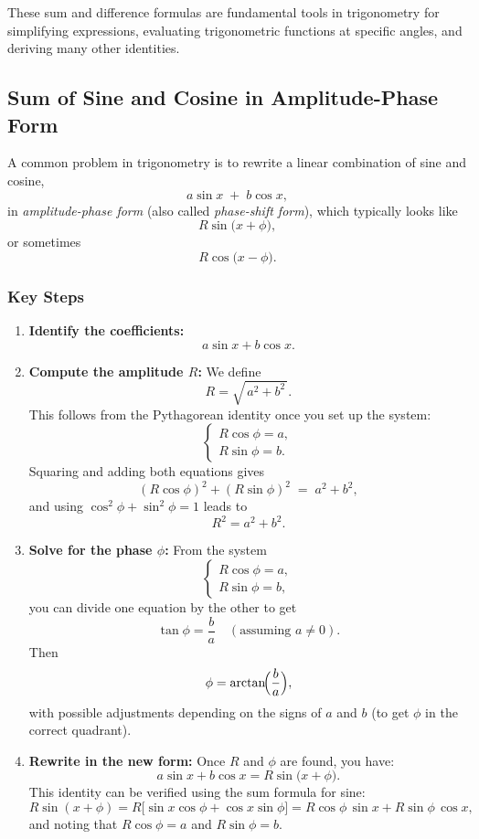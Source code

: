 \documentclass{article}
\begin{document}
\begin{multicols}{2}
These sum and difference formulas are fundamental tools in trigonometry for simplifying expressions, evaluating trigonometric functions at specific angles, and deriving many other identities.

\subsection*{Sum of Sine and Cosine in Amplitude-Phase Form}

A common problem in trigonometry is to rewrite a linear combination of sine and cosine,
\[
a \sin x \;+\; b \cos x,
\]
in \emph{amplitude-phase form} (also called \emph{phase-shift form}), which typically looks like
\[
R \sin\!\bigl(x + \phi\bigr),
\]
or sometimes
\[
R \cos\!\bigl(x - \phi\bigr).
\]

\subsubsection*{Key Steps}

\begin{enumerate}
\item \textbf{Identify the coefficients:}
  \[
  a \sin x + b \cos x.
  \]
\item \textbf{Compute the amplitude \(R\):}  
  We define
  \[
    R = \sqrt{\,a^2 + b^2\,}.
  \]
  This follows from the Pythagorean identity once you set up the system:
  \[
    \begin{cases}
      R \cos \phi = a,\\[6pt]
      R \sin \phi = b.
    \end{cases}
  \]
  Squaring and adding both equations gives
  \[
    (R \cos \phi)^2 + (R \sin \phi)^2 \;=\; a^2 + b^2,
  \]
  and using \(\cos^2 \phi + \sin^2 \phi = 1\) leads to
  \[
    R^2 = a^2 + b^2.
  \]
\item \textbf{Solve for the phase \(\phi\):}
  From the system
  \[
    \begin{cases}
      R \cos \phi = a,\\[6pt]
      R \sin \phi = b,
    \end{cases}
  \]
  you can divide one equation by the other to get
  \[
    \tan \phi = \dfrac{b}{a}
    \quad(\text{assuming }a \neq 0).
  \]
  Then
  \[
    \phi = \arctan\!\Bigl(\dfrac{b}{a}\Bigr),
  \]
  with possible adjustments depending on the signs of \(a\) and \(b\) (to get \(\phi\) in the correct quadrant).
\item \textbf{Rewrite in the new form:}
  Once \(R\) and \(\phi\) are found, you have:
  \[
    a \sin x + b \cos x = R \sin\bigl(x + \phi\bigr).
  \]
  This identity can be verified using the sum formula for sine:
  \[
    R \sin(x + \phi) = R\bigl[\sin x \cos \phi + \cos x \sin \phi\bigr]
    = R \cos \phi\, \sin x + R \sin \phi\, \cos x,
  \]
  and noting that \(R \cos \phi = a\) and \(R \sin \phi = b\).
\end{enumerate}


\end{multicols}
\end{document}
